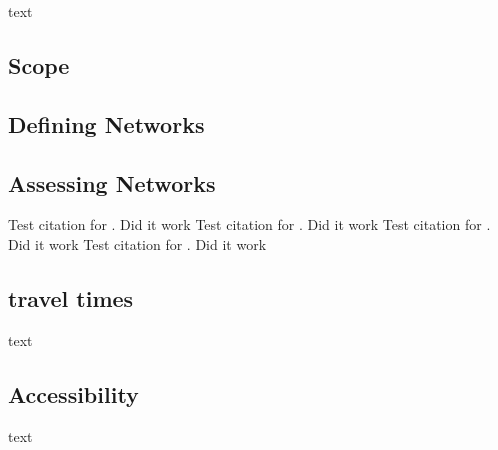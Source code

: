 text

\subsection{Scope}

\subsection{Defining Networks}

\subsection{Assessing Networks}

Test citation for \cite{osmnx}. Did it work
Test citation for \cite{networkx}. Did it work
Test citation for \cite{qgis}. Did it work
Test citation for \cite{python}. Did it work
\subsection{travel times}

text

\subsection{Accessibility}

text